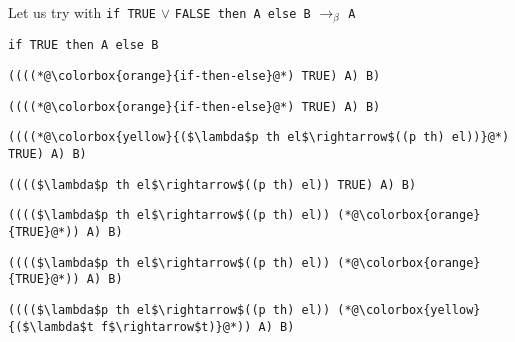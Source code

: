 \documentclass{beamer}
\begin{document}
\begin{frame}[fragile]{\CurrentSection}
\begin{block}{\CurrentSubSection}
Let us try with \texttt{if TRUE} $\vee$ \texttt{FALSE then A else B} $\rightarrow_\beta$ \texttt{A}
\end{block}


\end{frame}

\begin{frame}[fragile]{\CurrentSection}
\lstset{basicstyle=\ttfamily\small}\lstset{numbers=none}\lstset{language=ML}\begin{lstlisting}
if TRUE then A else B
\end{lstlisting}
\pause\lstset{language=ML}\begin{lstlisting}
((((*@\colorbox{orange}{if-then-else}@*) TRUE) A) B)
\end{lstlisting}

\end{frame}

\begin{frame}[fragile]{\CurrentSection}
\lstset{basicstyle=\ttfamily\small}\lstset{numbers=none}\lstset{language=ML}\begin{lstlisting}
((((*@\colorbox{orange}{if-then-else}@*) TRUE) A) B)
\end{lstlisting}
\pause\lstset{language=ML}\begin{lstlisting}
((((*@\colorbox{yellow}{($\lambda$p th el$\rightarrow$((p th) el))}@*) TRUE) A) B)
\end{lstlisting}

\end{frame}

\begin{frame}[fragile]{\CurrentSection}
\lstset{basicstyle=\ttfamily\small}\lstset{numbers=none}\lstset{language=ML}\begin{lstlisting}
(((($\lambda$p th el$\rightarrow$((p th) el)) TRUE) A) B)
\end{lstlisting}
\pause\lstset{language=ML}\begin{lstlisting}
(((($\lambda$p th el$\rightarrow$((p th) el)) (*@\colorbox{orange}{TRUE}@*)) A) B)
\end{lstlisting}

\end{frame}

\begin{frame}[fragile]{\CurrentSection}
\lstset{basicstyle=\ttfamily\small}\lstset{numbers=none}\lstset{language=ML}\begin{lstlisting}
(((($\lambda$p th el$\rightarrow$((p th) el)) (*@\colorbox{orange}{TRUE}@*)) A) B)
\end{lstlisting}
\pause\lstset{language=ML}\begin{lstlisting}
(((($\lambda$p th el$\rightarrow$((p th) el)) (*@\colorbox{yellow}{($\lambda$t f$\rightarrow$t)}@*)) A) B)
\end{lstlisting}

\end{frame}
\end{document}
